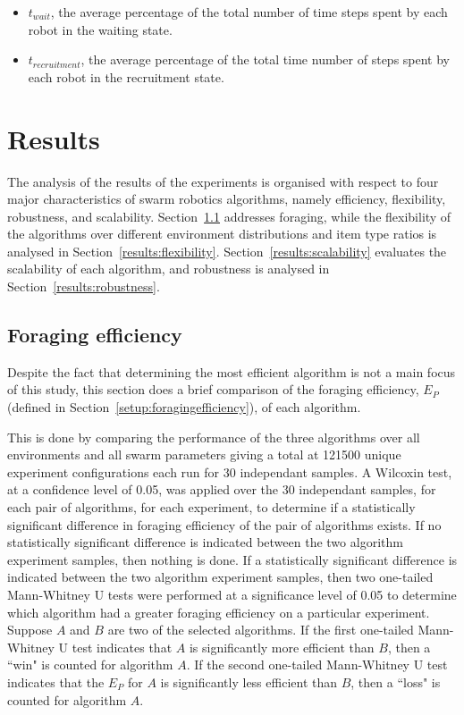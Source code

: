\documentclass[preprint,12pt]{elsarticle}
\begin{document}
\begin{itemize}
\item $t_{wait}$, the average percentage of the total number of time steps spent by each robot in the waiting state.
\item $t_{recruitment}$, the average percentage of the total time number of steps spent by each robot in the recruitment state.
\end{itemize}


\section{Results}
\label{results}

The analysis of the results of the experiments is organised with respect to four major characteristics of swarm robotics algorithms, namely efficiency, flexibility, robustness, and scalability. Section~\ref{results:efficiency} addresses foraging, while the flexibility of the algorithms over different environment distributions and item type ratios is analysed in Section~\ref{results:flexibility}. Section~\ref{results:scalability} evaluates the scalability of each algorithm, and robustness is analysed in Section~\ref{results:robustness}.

\subsection{Foraging efficiency}
\label{results:efficiency}


Despite the fact that determining the most efficient algorithm is not a main focus of this study, this section does a brief comparison of the foraging efficiency, $E_P$ (defined in Section~\ref{setup:foragingefficiency}), of each algorithm. 

This is done by comparing the performance of the three algorithms over all environments and all swarm parameters giving a total at 121500 unique experiment configurations each run for 30 independant samples. A Wilcoxin test, at a confidence level of 0.05, was applied over the 30 independant samples, for each pair of algorithms, for each experiment, to determine if a statistically significant difference in foraging efficiency of the pair of algorithms exists. If no statistically significant difference is indicated between the two algorithm experiment samples, then nothing is done. If a statistically significant difference is indicated between the two algorithm experiment samples, then two one-tailed Mann-Whitney U tests were performed at a significance level of 0.05 to determine which algorithm had a greater foraging efficiency on a particular experiment. Suppose $A$ and $B$ are two of the selected algorithms. If the first one-tailed Mann-Whitney U test indicates that $A$ is significantly more efficient than $B$, then a ``win" is counted for algorithm $A$. If the second one-tailed Mann-Whitney U test indicates that the $E_P$ for $A$ is significantly less efficient than $B$, then a ``loss" is counted for algorithm $A$. 
\end{document}
